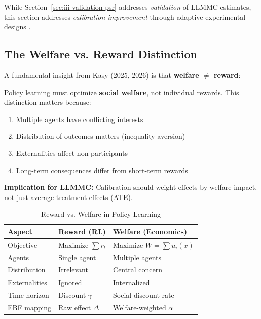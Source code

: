 While Section~\ref{sec:iii-validation-psr} addresses \emph{validation} of LLMMC estimates,
this section addresses \emph{calibration improvement} through adaptive experimental designs
\citep{kasy2021adaptive, caria2024refugees}.

\subsection{The Welfare vs. Reward Distinction}

A fundamental insight from Kasy (2025, 2026) is that \textbf{welfare $\neq$ reward}:

\begin{tcolorbox}[colback=blue!5!white, colframe=blue!75!black,
    title=Axiom UNMAPPED_CAL-6: Welfare-Reward Distinction (Kasy Criterion)]
Policy learning must optimize \textbf{social welfare}, not individual rewards.
This distinction matters because:
\begin{enumerate}[nosep]
\item Multiple agents have conflicting interests
\item Distribution of outcomes matters (inequality aversion)
\item Externalities affect non-participants
\item Long-term consequences differ from short-term rewards
\end{enumerate}

\textbf{Implication for LLMMC:} Calibration should weight effects by welfare impact,
not just average treatment effects (ATE).
\end{tcolorbox}

\begin{table}[h]
\centering
\caption{Reward vs. Welfare in Policy Learning}
\label{tab:reward-welfare}
\begin{tabular}{lll}
\toprule
\textbf{Aspect} & \textbf{Reward (RL)} & \textbf{Welfare (Economics)} \\
\midrule
Objective & Maximize $\sum r_t$ & Maximize $W = \sum u_i(x)$ \\
Agents & Single agent & Multiple agents \\
Distribution & Irrelevant & Central concern \\
Externalities & Ignored & Internalized \\
Time horizon & Discount $\gamma$ & Social discount rate \\
EBF mapping & Raw effect $\Delta$ & Welfare-weighted $\alpha$ \\
\bottomrule
\end{tabular}
\end{table}

